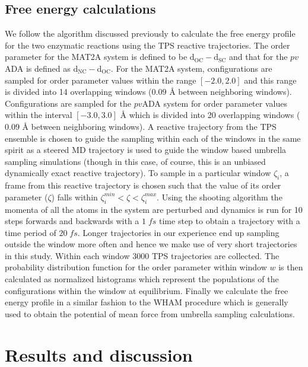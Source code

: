 \documentclass[journal=jpcbfk,manuscript=article,layout=traditional]{achemso}
\begin{document}
\subsection{Free energy calculations}
We follow the algorithm discussed previously to calculate the free energy
profile for the two enzymatic reactions using the TPS reactive trajectories. 
The order parameter for the MAT2A system 
is defined to be d$_{\text{OC}}-$d$_{\text{SC}}$ and that for the $pv$ADA is defined as 
d$_{\text{NC}}-$d$_{\text{OC}}$. For the MAT2A system, configurations are sampled
for order parameter values within the range $[-2.0,2.0]$ and this range is divided 
into 14 overlapping windows ($0.09$ {\AA} between neighboring windows). 
Configurations are sampled for the $pv$ADA system for order parameter values 
within the interval $[-3.0, 3.0]$ {\AA} which is divided into 20 overlapping 
windows ($0.09$ {\AA} between neighboring windows). A reactive 
trajectory from the TPS ensemble is chosen to guide the sampling 
within each of the windows in the same spirit as a steered MD trajectory 
is used to guide the window based umbrella sampling simulations (though in this case,
of course, this is an unbiased dynamically exact reactive trajectory). 
To sample in a particular window $\zeta_i$, a frame from this reactive 
trajectory is chosen such that the value of its 
order parameter ($\zeta$) falls within 
$\zeta_{i}^{min} < \zeta < \zeta_{i}^{max}$. Using the shooting algorithm
the momenta of all the atoms in the system are perturbed 
and dynamics is run for 10 steps forwards and backwards with a 
$1\;fs$ time step to obtain a trajectory with a time period of $20\;fs$.
Longer trajectories in our experience end up sampling outside the window 
more often and hence we make use of very short trajectories in this study.     
Within each window 3000 TPS trajectories are collected. The 
probability distribution function for the order parameter within window $w$ 
is then calculated as normalized histograms which represent the populations 
of the configurations within the window at equilibrium. 
Finally we calculate the free energy profile in a similar fashion to the WHAM 
procedure \cite{Kumar92JComputChem13p1011} which is generally used to obtain the 
potential of mean force from umbrella sampling calculations. 
\section{Results and discussion}
\end{document}
